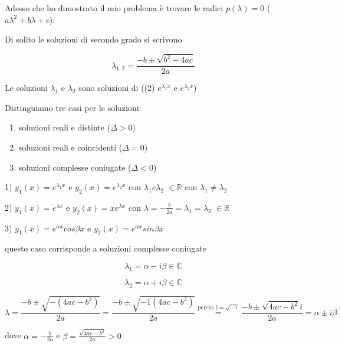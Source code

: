 \documentclass[11pt]{article}
\begin{document}
Adesso che ho dimostrato il mio problema è trovare le radici $p(\lambda) =0$ ($a \lambda ^{2} + b \lambda + c$):

Di solito le soluzioni di secondo grado si scrivono

\[
    \lambda_{1,2} = \frac{-b \pm \sqrt{b ^{2}-4 ac}}{2a}
\]
   
Le soluzioni $\lambda_1$ e $\lambda_2$ sono soluzioni di ((2) $e ^{\lambda_1x}$ e $e ^{\lambda_2x}$)

Distinguiamo tre casi per le soluzioni:

\begin{enumerate}
    \item soluzioni reali e distinte ($\Delta >0$)
    \item soluzioni reali e coincidenti ($\Delta = 0$)
    \item soluzioni complesse coniugate ($ \Delta <0$)
\end{enumerate}

1) $y_1(x) = e ^{\lambda_1x}$ e $y_2(x) = e ^{\lambda_2x}$ con $\lambda_1 e \lambda_2$ $\in \mathbb{R}$ con $\lambda_1 \neq \lambda_2$


2) $y_1(x) = e ^{\lambda x}$ e $y_2(x) = xe ^{\lambda x}$ con $\lambda = - \frac{b}{2a}=\lambda_1=\lambda_2$ $\in \mathbb{R}$ 

3) $y_1(x) = e ^{\alpha x} cos \beta x$ e $y_2(x) = e ^{\alpha x} sin \beta x$ 

questo caso corrisponde a soluzioni complesse coniugate  

\[
    \lambda_1 = \alpha- i \beta \in \mathbb{C} 
\]

\[
    \lambda_2 = \alpha+ i \beta \in \mathbb{C} 
\]

\[
    \lambda = \frac{-b \pm \sqrt{-(4ac-b^{2})}}{2a} = \frac{-b \pm \sqrt{-1(4ac - b^{2})}}{2a} \overset{\text{perche i} = \sqrt{-1}}{=} \frac{-b \pm  \sqrt{4ac -b^{2}}i}{2a} = \alpha \pm i \beta
\]

dove $\alpha = -\frac{b}{2a}$ e $\beta = \frac{\sqrt{4ac - b^{2}}}{2a} >0$


\end{document}
